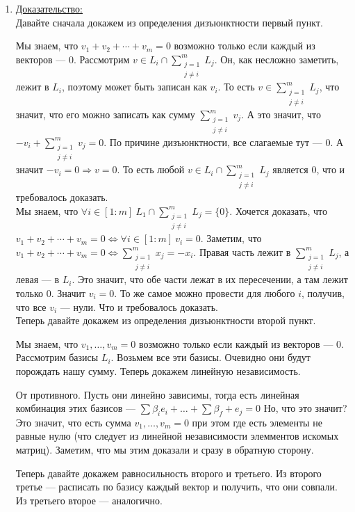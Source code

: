 \documentclass[twoside]{book}
\newcommand{\prooff}[1]{{\underline{Доказательство:}} \\ }
\begin{document}
\begin{enumerate}
    \item[]\prooff{}
          Давайте сначала докажем из определения дизъюнктности первый пункт.

          \fbox{\(\Rightarrow\)}  Мы знаем, что $v_1+v_2+\cdots+v_m=0$ возможно только если каждый из векторов --- $0$. Рассмотрим $v\in L_i\cap\sum\limits_{\substack{j=1\\j\neq i}}^mL_j$. Он, как несложно заметить, лежит в $L_i$, поэтому может быть записан как $v_i$. То есть $v\in\sum\limits_{\substack{j=1\\j\neq i}}^mL_j$, что значит, что его можно записать как сумму $\sum\limits_{\substack{j=1\\j\neq i}}^mv_j$. А это значит, что $-v_i+\sum\limits_{\substack{j=1\\j\neq i}}^mv_j=0$. По причине дизъюнктности, все слагаемые тут --- $0$. А значит $-v_i=0\Rightarrow v=0$. То есть любой $v\in L_i\cap\sum\limits_{\substack{j=1\\j\neq i}}^mL_j$ является $0$, что и требовалось доказать.\\

          \fbox{\(\Leftarrow\)}  Мы знаем, что $\forall i\in[1:m]~L_1\cap\sum\limits_{\substack{j=1\\j\neq i}}^mL_j=\{0\}$. Хочется доказать, что $v_1+v_2+\cdots+v_m=0\Leftrightarrow\forall i\in[1:m]~v_i=0$. Заметим, что $v_1+v_2+\cdots+v_m=0\Leftrightarrow\sum\limits_{\substack{j=1\\j\neq i}}^mx_j=-x_i$. Правая часть лежит в $\sum\limits_{\substack{j=1\\j\neq i}}^mL_j$, а левая --- в $L_i$. Это значит, что обе части лежат в их пересечении, а там лежит только $0$. Значит $v_i=0$. То же самое можно провести для любого $i$, получив, что все $v_i$ --- нули. Что и требовалось доказать.\\


          Теперь давайте докажем из определения дизъюнктности второй пункт.

          Мы знаем, что $v_1,\ldots, v_m=0$ возможно только если каждый из векторов  --- $0$. Рассмотрим базисы $L_i$. Возьмем все эти базисы. Очевидно они будут порождать нашу сумму. Теперь докажем линейную независимость.

          От противного. Пусть они линейно зависимы, тогда есть линейная комбинация этих базисов --- $\sum\limits \beta_i e_i+ \ldots + \sum\limits \beta_f + e_j = 0$
          Но, что это значит? Это значит, что есть  сумма $v_1,\ldots, v_m=0$ при этом где есть элементы не равные нулю (что следует из линейной независимости элемментов искомых матриц). Заметим, что мы этим доказали и сразу в обратную сторону.

          Теперь давайте докажем равносильность второго и третьего. Из второго третье --- расписать по базису каждый вектор и получить, что они совпали. Из третьего второе --- аналогично.

\end{enumerate}
\end{document}
